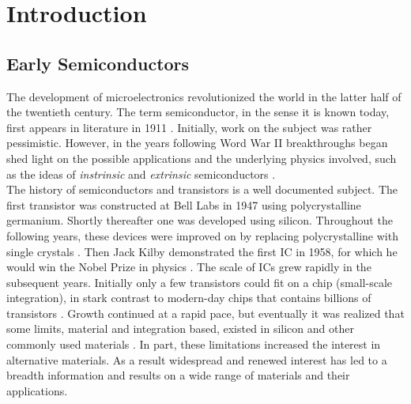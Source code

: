\chapter{Introduction}\label{sec:intro}
\section{Early Semiconductors}\label{sec:early_semicond}
The development of microelectronics revolutionized the world in the latter half of the twentieth century. The term semiconductor, in the sense it is known today, first appears in literature in 1911 \cite{Koenigsberger_AnnalenDerPhysik1911}. Initially, work on the subject was rather pessimistic. However, in the years following Word War II breakthroughs began shed light on the possible applications and the underlying physics involved, such as the ideas of \emph{instrinsic} and \emph{extrinsic} semiconductors \cite{Busch_EuroJournPhys1989,Lark_AAAS1954,Wilson_Royal1931a,Wilson_Royal1931b}. \\

The history of semiconductors and transistors is a well documented subject. The first transistor was constructed at Bell Labs in 1947 using polycrystalline germanium. Shortly thereafter one was developed using silicon. Throughout the following years, these devices were improved on by replacing polycrystalline with single crystals \cite{Neamen_Semiconductor_Physics2003}. Then Jack Kilby demonstrated the first  \ac{IC} in 1958, for which he would win the Nobel Prize in physics \cite{Lukasiak_JorunTelcomm2010, Kilby_Patent1959}. The scale of \acp{IC} grew rapidly in the subsequent years. Initially only a few transistors could fit on a chip (small-scale integration), in stark contrast to modern-day chips that contains billions of transistors \cite{Moore_Electronics1965, Clarke_EEtimes2005}. Growth continued at a rapid pace, but eventually it was realized that some limits, material and integration based, existed in silicon and other commonly used materials \cite{Meindl_Science2001, Schulz_Nature1999}. In part, these limitations increased the interest in alternative materials. As a result widespread and renewed interest has led to a breadth information and results on a wide range of materials and their applications.

